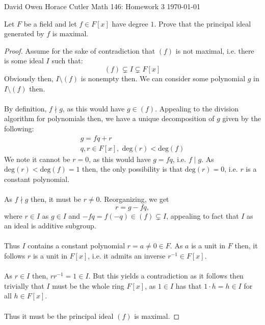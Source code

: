 \documentclass[12pt]{article}
\newenvironment{ex}[2][Exercise]{\begin{trivlist}
\item[\hskip \labelsep {\bfseries #1}\hskip \labelsep {\bfseries #2.}]}{\end{trivlist}}
\begin{document}
\noindent David Owen Horace Cutler \hfill {\Large Math 146: Homework 3} \hfill \today

\begin{ex}{1}
    Let $F$ be a field and let $f \in F[x]$ have degree $1$. Prove that the principal ideal generated by $f$ is maximal.
    \begin{proof}
        Assume for the sake of contradiction that $(f)$ is not maximal, i.e. there is some ideal $I$ such that:
        $$(f) \subsetneq I \subsetneq F[x]$$
        Obviously then, $I \setminus (f)$ is nonempty then. We can consider some polynomial $g$ in $I \setminus (f)$ then. \\ \\
        By definition, $f \nmid g$, as this would have $g \in (f)$. Appealing to the division algorithm for polynomials then, we have a unique decomposition of $g$ given by the following:
            \begin{equation}
                \begin{aligned}
                g = fq + r \\
                q, r \in F[x], \; \text{deg}(r) < \text{deg}(f)
                \end{aligned}
            \end{equation}
            We note it cannot be $r = 0$, as this would have $g = fq$, i.e. $f \mid g$. As $\text{deg}(r) < \text{deg}(f) = 1$ then, the only possibility is that $\text{deg}(r) = 0$, i.e. $r$ is a constant polynomial. \\ \\
            As $f \nmid g$ then, it must be $r \neq 0$. Reorganizing, we get
            $$r = g - fq,$$
            where $r \in I$ as $g \in I$ and $-fq = f(-q) \in (f) \subsetneq I$, appealing to fact that $I$ as an ideal is additive subgroup. \\ \\
            Thus $I$ contains a constant polynomial $r = a \neq 0 \in F$. As $a$ is a unit in $F$ then, it follows $r$ is a unit in $F[x]$, i.e. it admits an inverse $r^{-1} \in F[x]$. \\ \\
            As $r \in I$ then, $rr^{-1} = 1 \in I$. But this yields a contradiction as it follows then trivially that $I$ must be the whole ring $F[x]$, as $1 \in I$ has that $1 \cdot h = h \in I$ for all $h \in F[x]$. \\ \\
            Thus it must be the principal ideal $(f)$ is maximal.
    \end{proof}
\end{ex}
\end{document}
